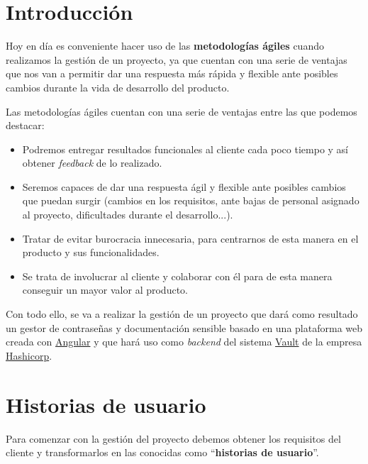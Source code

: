 \documentclass{\ClassPath/viu-tfm-template}
\begin{document}
    \graphicspath{{../VIU_TFM_LaTeX_template/}}

    \coverpage

    \tableofcontents

\chapter{Introducción}

Hoy en día es conveniente hacer uso de las \textbf{metodologías ágiles} cuando realizamos la gestión de un proyecto, ya que cuentan con una serie de ventajas que nos van a permitir dar una respuesta más rápida y flexible ante posibles cambios durante la vida de desarrollo del producto.

Las metodologías ágiles cuentan con una serie de ventajas entre las que podemos destacar:

\begin{itemize}
    \item Podremos entregar resultados funcionales al cliente cada poco tiempo y así obtener \textit{feedback} de lo realizado.
    \item Seremos capaces de dar una respuesta ágil y flexible ante posibles cambios que puedan surgir (cambios en los requisitos, ante bajas de personal asignado al proyecto, dificultades durante el desarrollo...).
    \item Tratar de evitar burocracia innecesaria, para centrarnos de esta manera en el producto y sus funcionalidades.
    \item Se trata de involucrar al cliente y colaborar con él para de esta manera conseguir un mayor valor al producto.
\end{itemize}

Con todo ello, se va a realizar la gestión de un proyecto que dará como resultado un gestor de contraseñas y documentación sensible basado en una plataforma web creada con \href{https://angular.io/}{Angular} y que hará uso como \textit{backend} del sistema \href{https://www.vaultproject.io/}{Vault} de la empresa \href{https://www.hashicorp.com/}{Hashicorp}.


\chapter{Historias de usuario}

Para comenzar con la gestión del proyecto debemos obtener los requisitos del cliente y transformarlos en las conocidas como “\textbf{historias de usuario}”.
\end{document}
